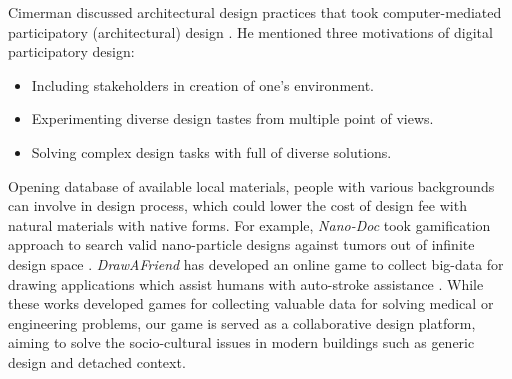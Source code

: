 Cimerman discussed architectural design practices that took computer-mediated participatory (architectural) design \cite{cimerman2000participatory}.
He mentioned three motivations of digital participatory design:
\begin{itemize}
 \item{Including stakeholders in creation of one's environment.}
 \item{Experimenting diverse design tastes from multiple point of views.}
 \item{Solving complex design tasks with full of diverse solutions.}
\end{itemize}

Opening database of available local materials, people with various backgrounds can involve in design process, which could lower the cost of design fee with natural materials with native forms.
For example, \textit{Nano-Doc} took gamification approach to search valid nano-particle designs against tumors out of infinite design space \cite{hauertcrowdsourcing}.
\textit{DrawAFriend} has developed an online game to collect big-data for drawing applications which assist humans with auto-stroke assistance \cite{limpaecher2013real}.
While these works developed games for collecting valuable data for solving medical or engineering problems, our game is served as a collaborative design platform, aiming to solve the socio-cultural issues in modern buildings such as generic design and detached context.
